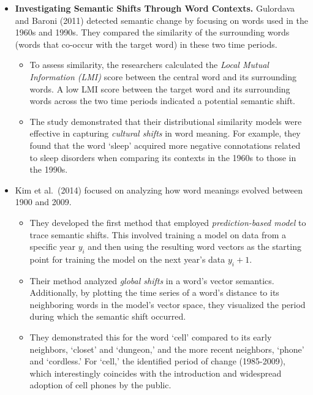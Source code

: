 \begin{itemize}
    \item \textbf{Investigating Semantic Shifts Through Word Contexts.}
    Gulordava and Baroni (2011) detected semantic change by focusing on words used in the 1960s and 1990s.
        They compared the similarity of the surrounding words (words that co-occur with the target word) in these two time periods.
    \begin{itemize}
        \item To assess similarity, the researchers calculated the \emph{Local Mutual Information (LMI)} score between the central word and its surrounding words.
        A low LMI score between the target word and its surrounding words across the two time periods indicated a potential semantic shift.
        \item The study demonstrated that their distributional similarity models were effective in capturing \emph{cultural shifts} in word meaning.
        For example, they found that the word `sleep' acquired more negative connotations related to sleep disorders when comparing its contexts in the 1960s to those in the 1990s.
    \end{itemize}

    \item {}
    Kim et al.\ (2014) focused on analyzing how word meanings evolved between 1900 and 2009.
    \begin{itemize}
        \item They developed the first method that employed \emph{prediction-based model} to trace semantic shifts.
        This involved training a model on data from a specific year $y_i$ and then using the resulting word vectors as the starting point for training the model on the next year's data $y_i+1$.
        \item Their method analyzed \emph{global shifts} in a word's vector semantics.
        Additionally, by plotting the time series of a word's distance to its neighboring words in the model's vector space, they visualized the period during which the semantic shift occurred.
        \item They demonstrated this for the word `cell' compared to its early neighbors, `closet' and `dungeon,' and the more recent neighbors, `phone' and `cordless.'
        For `cell,' the identified period of change (1985-2009), which interestingly coincides with the introduction and widespread adoption of cell phones by the public.
    \end{itemize}


\end{itemize}
